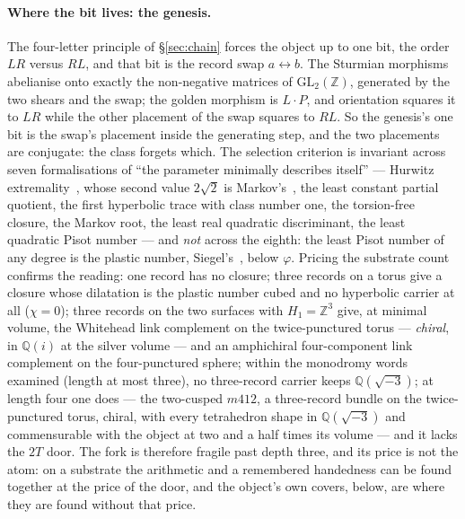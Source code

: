 \documentclass[11pt,a4paper]{article}
\theoremstyle{definition}
\theoremstyle{remark}
\newcommand{\Q}{\mathbb{Q}}
\newcommand{\Z}{\mathbb{Z}}
\begin{document}
\paragraph{Where the bit lives: the genesis.} The four-letter principle of \S\ref{sec:chain} forces the object
up to one bit, the order $LR$ versus $RL$, and that bit is the record swap $a \leftrightarrow b$. The Sturmian
morphisms~\cite{lothaire} abelianise onto exactly the non-negative matrices of $\mathrm{GL}_2(\Z)$, generated by
the two shears and the swap; the golden morphism is $L\cdot P$, and orientation squares it to $LR$ while the
other placement of the swap squares to $RL$. So the genesis's one bit is the swap's placement inside the generating step,
and the two placements are conjugate: the class forgets which. The selection criterion is invariant across
seven formalisations of ``the parameter minimally describes itself'' --- Hurwitz extremality~\cite{hurwitz},
whose second value $2\sqrt{2}$ is Markov's~\cite{markov}, the least constant partial quotient, the first
hyperbolic trace with class number one, the torsion-free closure, the Markov root, the least real quadratic
discriminant, the least quadratic Pisot number --- and \emph{not} across the eighth: the least Pisot number of any
degree is the plastic number, Siegel's~\cite{siegel}, below $\varphi$. Pricing the substrate count confirms the
reading: one record has no closure; three records on a torus give a closure whose dilatation is the plastic
number cubed and no hyperbolic carrier at all ($\chi = 0$); three records on the two surfaces with $H_1 = \Z^3$ give, at minimal volume,
the Whitehead link complement on the twice-punctured torus --- \emph{chiral}, in $\Q(i)$ at the silver volume --- and
an amphichiral four-component link complement on the four-punctured sphere; within the monodromy words examined
(length at most three), no three-record carrier keeps $\Q(\sqrt{-3})$; at length four one does --- the two-cusped $m412$, a three-record bundle on the twice-punctured torus, chiral, with every tetrahedron shape in $\Q(\sqrt{-3})$ and commensurable with the object at two and a half times its volume --- and it lacks the $2T$ door. The fork is therefore fragile past depth three, and its price is not the atom: on a substrate the arithmetic and a remembered handedness can be found together at the price of the door, and the object's own covers, below, are where they are found without that price.
\end{document}
